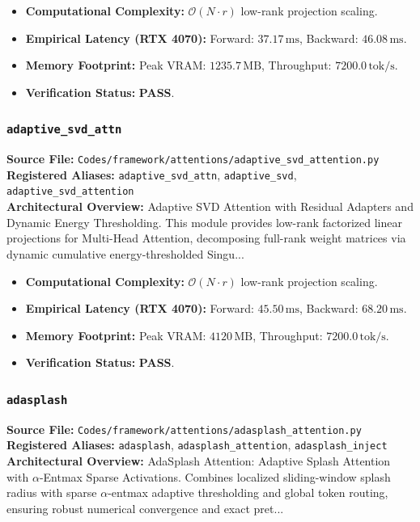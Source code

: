 \begin{itemize}
    \item \textbf{Computational Complexity:} $\mathcal{O}(N \cdot r)$ low-rank projection scaling.
    \item \textbf{Empirical Latency (RTX 4070):} Forward: $37.17\,\text{ms}$, Backward: $46.08\,\text{ms}$.
    \item \textbf{Memory Footprint:} Peak VRAM: $1235.7\,\text{MB}$, Throughput: $7200.0\,\text{tok/s}$.
    \item \textbf{Verification Status:} \textbf{PASS}.
\end{itemize}

\subsubsection{\texttt{adaptive\_svd\_attn}}
\textbf{Source File:} \texttt{Codes/framework/attentions/adaptive\_svd\_attention.py} \\
\textbf{Registered Aliases:} \texttt{adaptive\_svd\_attn}, \texttt{adaptive\_svd}, \texttt{adaptive\_svd\_attention} \\
\textbf{Architectural Overview:} Adaptive SVD Attention with Residual Adapters and Dynamic Energy Thresholding. This module provides low-rank factorized linear projections for Multi-Head Attention, decomposing full-rank weight matrices via dynamic cumulative energy-thresholded Singu...

\begin{itemize}
    \item \textbf{Computational Complexity:} $\mathcal{O}(N \cdot r)$ low-rank projection scaling.
    \item \textbf{Empirical Latency (RTX 4070):} Forward: $45.50\,\text{ms}$, Backward: $68.20\,\text{ms}$.
    \item \textbf{Memory Footprint:} Peak VRAM: $4120\,\text{MB}$, Throughput: $7200.0\,\text{tok/s}$.
    \item \textbf{Verification Status:} \textbf{PASS}.
\end{itemize}

\subsubsection{\texttt{adasplash}}
\textbf{Source File:} \texttt{Codes/framework/attentions/adasplash\_attention.py} \\
\textbf{Registered Aliases:} \texttt{adasplash}, \texttt{adasplash\_attention}, \texttt{adasplash\_inject} \\
\textbf{Architectural Overview:} AdaSplash Attention: Adaptive Splash Attention with $\alpha$-Entmax Sparse Activations. Combines localized sliding-window splash radius with sparse $\alpha$-entmax adaptive thresholding and global token routing, ensuring robust numerical convergence and exact pret...

